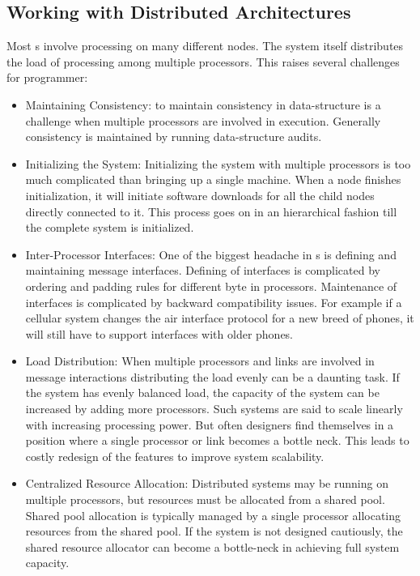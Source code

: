\subsection{Working with Distributed Architectures}
Most \rts s involve processing on many different nodes. The system itself distributes the load of processing among multiple processors. This raises several challenges for programmer:
\begin{itemize}
    \item Maintaining Consistency: to maintain consistency in data-structure is a challenge when multiple processors are involved in execution. Generally consistency is maintained by running data-structure audits.
    \item Initializing the System: Initializing the system with multiple processors is too much complicated than bringing up a single machine. 
    When a node finishes initialization, it will initiate software downloads for all the child nodes directly connected to it. This process goes on in an hierarchical fashion till the complete system is initialized.
    \item Inter-Processor Interfaces: One of the biggest headache in \rts s is defining and maintaining message interfaces. Defining of interfaces is complicated by ordering and padding rules for different byte in processors. Maintenance of interfaces is complicated by backward compatibility issues. For example if a cellular system changes the air interface protocol for a new breed of phones, it will still have to support interfaces with older phones.
    \item Load Distribution: When multiple processors and links are involved in message interactions distributing the load evenly can be a daunting task. If the system has evenly balanced load, the capacity of the system can be increased by adding more processors. Such systems are said to scale linearly with increasing processing power. But often designers find themselves in a position where a single processor or link becomes a bottle neck. This leads to costly redesign of the features to improve system scalability.
    \item Centralized Resource Allocation: Distributed systems may be running on multiple processors, but resources must be allocated from a shared pool. Shared pool allocation is typically managed by a single processor allocating resources from the shared pool. If the system is not designed cautiously, the shared resource allocator can become a bottle-neck in achieving full system capacity.
\end{itemize}

